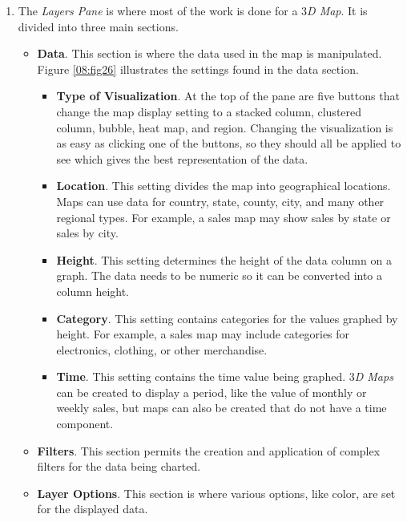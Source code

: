 \begin{enumerate}[resume]
	\item The \textit{Layers Pane} is where most of the work is done for a \textit{$ 3 $D Map}. It is divided into three main sections.
	
	\begin{itemize}
		\item \textbf{Data}. This section is where the data used in the map is manipulated. Figure \ref{08:fig26} illustrates the settings found in the data section.

		\begin{itemize}
			\item \textbf{Type of Visualization}. At the top of the pane are five buttons that change the map display setting to a stacked column, clustered column, bubble, heat map, and region. Changing the visualization is as easy as clicking one of the buttons, so they should all be applied to see which gives the best representation of the data.
			\item \textbf{Location}. This setting divides the map into geographical locations. Maps can use data for country, state, county, city, and many other regional types. For example, a sales map may show sales by state or sales by city.
			\item \textbf{Height}. This setting determines the height of the data column on a graph. The data needs to be numeric so it can be converted into a column height.
			\item \textbf{Category}. This setting contains categories for the values graphed by height. For example, a sales map may include categories for electronics, clothing, or other merchandise.
			\item \textbf{Time}. This setting contains the time value being graphed. \textit{$ 3 $D Maps} can be created to display a period, like the value of monthly or weekly sales, but maps can also be created that do not have a time component.
		\end{itemize}		

		\item \textbf{Filters}. This section permits the creation and application of complex filters for the data being charted.
		\item \textbf{Layer Options}. This section is where various options, like color, are set for the displayed data.
	\end{itemize}


\end{enumerate}
